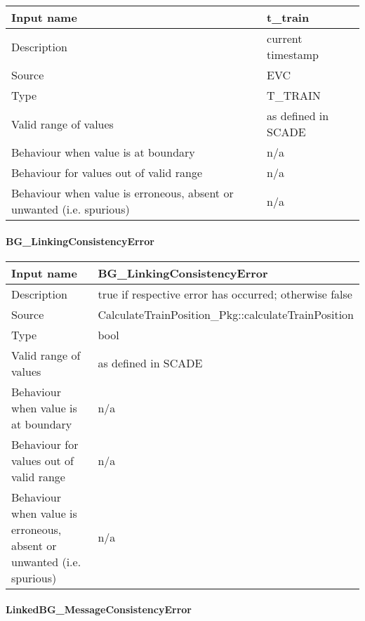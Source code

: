 \begin{longtable}{p{}p{}}
\toprule
Input name				& t\_train \\
\midrule
Description				& current timestamp \\
\midrule
Source					& EVC \\ 
\midrule
Type					& T\_TRAIN \\
\midrule
Valid range of values	& as defined in SCADE \\
\midrule
Behaviour when value is at boundary	& n/a \\
\midrule
Behaviour for values out of valid range	& n/a \\
\midrule
Behaviour when value is erroneous, absent or unwanted (i.e. spurious) & n/a \\
\bottomrule
\end{longtable}

\paragraph{BG\_LinkingConsistencyError}

\begin{longtable}{p{}p{}}
\toprule
Input name				& BG\_LinkingConsistencyError \\
\midrule
Description				& true if respective error has occurred; otherwise false \\
\midrule
Source					& CalculateTrainPosition\_Pkg::calculateTrainPosition \\ 
\midrule
Type					& bool \\
\midrule
Valid range of values	& as defined in SCADE \\
\midrule
Behaviour when value is at boundary	& n/a \\
\midrule
Behaviour for values out of valid range	& n/a \\
\midrule
Behaviour when value is erroneous, absent or unwanted (i.e. spurious) & n/a \\
\bottomrule
\end{longtable}

\paragraph{LinkedBG\_MessageConsistencyError}

